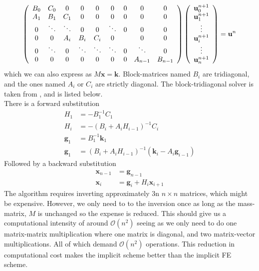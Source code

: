 \begin{align}\label{block_tridiagonal_matrix}
   \left(\begin{array}{c c c c c c c c c}
        B_0 & C_0 &0 &0 &0 &0 &0 &0 &0\\
        A_1 & B_1 & C_1 &0 &0 &0 &0 &0 &0\\
        0&\ddots & \ddots & 0 & 0 & \ddots &0&0&0\\
        0 & 0&A_i & B_i & C_i& 0 &  &0&0\\
        0& \ddots&0&\ddots & \ddots & \ddots & 0 & \ddots &0\\
         0&0 &0 &0&0 &0&0&A_{n-1} & B_{n-1}
       \end{array}\right) \left(\begin{array}{c}
             \mathbf{u}^{n+1}_{0}\\
             \mathbf{u}^{n+1}_{1}\\
             \vdots\\
             \mathbf{u}^{n+1}_{i}\\
             \vdots\\
             \mathbf{u}^{n+1}_{n}
             \end{array}\right) = \mathbf{u}^{n}
\end{align}
which we can also express as $M\mathbf{x} = \mathbf{k}$. Block-matrices named $B_i$ are tridiagonal, and the ones named $A_i$ or $C_i$ are strictly diagonal. 
The block-tridiagonal solver is taken from \cite{}, and is listed below.\\
There is a forward substitution
\begin{align*}
 H_1 &= -B_1^{-1}C_1\nonumber \\
 H_i &= -\left(B_i+A_iH_{i-1}\right)^{-1}C_i \nonumber \\
 \mathbf{g}_1 &= B_1^{-1}\mathbf{k}_1 \nonumber\\
 \mathbf{g}_1 &= \left(B_i+A_iH_{i-1}\right)^{-1}\left(\mathbf{k}_i-A_i\mathbf{g}_{i-1}\right)\nonumber
 \end{align*}
 Followed by a backward substitution
 \begin{align*}
  \mathbf{x}_{n-1} &= \mathbf{g}_{n-1}\nonumber\\
  \mathbf{x}_i &= \mathbf{g}_i + H_i\mathbf{x}_{i+1} \nonumber
 \end{align*}
The algorithm requires inverting approximately 3n $n\times n$ matrices, which might be expensive. 
However, we only need to to the inversion once as long as the mass-matrix, $M$ is unchanged so the expense is reduced. 
This should give us a computational intensity of around $\mathcal{O}(n^2)$ seeing as we only need to do one matrix-matrix multiplication where one matrix is diagonal, and two matrix-vector multiplications. 
All of which demand $\mathcal{O}(n^2)$ operations. This reduction in computational cost makes the implicit scheme better than the implicit FE scheme.

